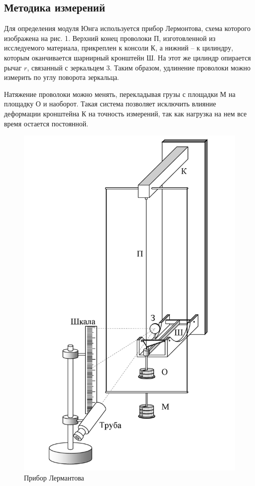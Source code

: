 \documentclass[12pt]{article}
\begin{document}
    \subsection{Методика измерений}
    \par Для определения модуля Юнга используется прибор Лермонтова,
    схема которого изображена на рис. 1. Верхний конец проволоки П, изготовленной
    из исследуемого материала, прикреплен к консоли К, а
    нижний -- к цилиндру, которым оканчивается шарнирный кронштейн
    Ш. На этот же цилиндр опирается рычаг $r$, связанный с зеркальцем
    3. Таким образом, удлинение проволоки можно измерить по углу
    поворота зеркальца.\\
    \par Натяжение проволоки можно менять, перекладывая грузы с
    площадки М на площадку О и наоборот. Такая система позволяет
    исключить влияние деформации кронштейна К на точность измерений, так
    как нагрузка на нем все время остается постоянной.

    \begin{figure}[H]
        \centering
        \includegraphics[scale = 0.3]{pictures/lermantov.png}
        \caption{Прибор Лермантова}
    \end{figure}
\end{document}
